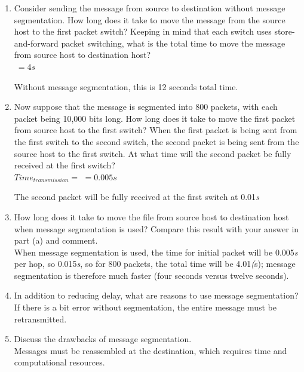 \documentclass[12pt]{article}
\begin{document}
\begin{enumerate}
    \begin{enumerate}
        \item Consider sending the message from source to destination without message segmentation. How long does it take to move the message from the source host to the first packet switch? Keeping in mind that each switch uses store-and-forward packet switching, what is the total time to move the message from source host to destination host?\\[1em]
        \(\ =4s\)\par
        Without message segmentation, this is 12 seconds total time.
        \item Now suppose that the message is segmented into 800 packets, with each packet being 10,000 bits long. How long does it take to move the first packet from source host to the first switch? When the first packet is being sent from the first switch to the second switch, the second packet is being sent from the source host to the first switch. At what time will the second packet be fully received at the first switch?\\[1em]
        \(
        Time_{transmission}=
        \)
        \(
        =0.005s
        \)\par
        The second packet will be fully received at the first switch at 0.01\textit{s}
        \item How long does it take to move the file from source host to destination host when message segmentation is used? Compare this result with your answer in part (a) and comment.\\[1em]
        When message segmentation is used, the time for initial packet will be 0.005\textit{s} per hop, so 0.015\textit{s}, so for 800 packets, the total time will be 4.01\textit(s); message segmentation is therefore much faster (four seconds versus twelve seconds).
        \item In addition to reducing delay, what are reasons to use message segmentation?\\[1em]
        If there is a bit error without segmentation, the entire message must be retransmitted.
        \item Discuss the drawbacks of message segmentation.\\[1em]
        Messages must be reassembled at the destination, which requires time and computational resources.
    \end{enumerate}

\end{enumerate}
\end{document}
